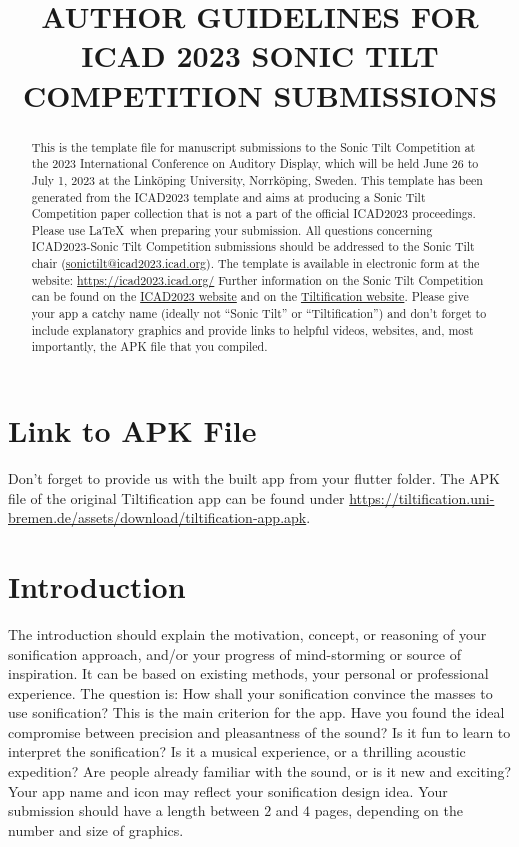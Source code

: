 \documentclass[a4paper,10pt,oneside]{article}
\title{AUTHOR GUIDELINES FOR ICAD 2023 SONIC TILT COMPETITION SUBMISSIONS}
\begin{document}
\ninept
\maketitle
\begin{sloppy}
\begin{abstract}
This is the template file for manuscript submissions to the Sonic Tilt Competition at the 2023 International Conference on Auditory Display, which will be held June 26 to July 1, 2023 at the Linköping University, Norrköping, Sweden. This template has been generated from the ICAD2023 template and aims at producing a Sonic Tilt Competition paper collection that is not a part of the official ICAD2023 proceedings. Please use \LaTeX\ when preparing your submission. All questions concerning ICAD2023-Sonic Tilt Competition submissions should be addressed to the Sonic Tilt chair (\href{mailto:sonictilt@icad2023.icad.org}{sonictilt@icad2023.icad.org}). The template is available in electronic form at the website: \href{https://icad2023.icad.org/}{https://icad2023.icad.org/} 
Further information on the Sonic Tilt Competition can be found on the \href{https://icad2023.icad.org/sonic-tilt/}{ICAD2023 website} and on the  \href{https://tiltification.uni-bremen.de/competition.html}{Tiltification website}. Please give your app a catchy name (ideally not ``Sonic Tilt'' or ``Tiltification'') and don't forget to include explanatory graphics and provide links to helpful videos, websites, and, most importantly, the APK file that you compiled.
\end{abstract}
\section{Link to APK File}
\label{sec:link}
Don't forget to provide us with the built app from your flutter folder. The APK file of the original Tiltification app can be found under \url{https://tiltification.uni-bremen.de/assets/download/tiltification-app.apk}.
\section{Introduction}
\label{sec:intro}

The introduction should explain the motivation, concept, or reasoning of your sonification approach, and/or your progress of mind-storming or source of inspiration. It can be based on existing methods, your personal or professional experience. The question is: How shall your sonification convince the masses to use sonification? This is the main criterion for the app. Have you found the ideal compromise between precision and pleasantness of the sound? Is it fun to learn to interpret the sonification? Is it a musical experience, or a thrilling acoustic expedition? Are people already familiar with the sound, or is it new and exciting? Your app name and icon may reflect your sonification design idea. Your submission should have a length between $2$ and $4$ pages, depending on the number and size of graphics.


\end{sloppy}
\end{document}
